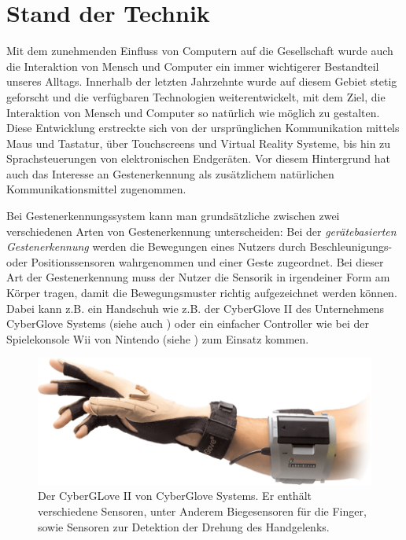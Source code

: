 \chapter{Stand der Technik}
\label{ch:StandDerTechnik}

Mit dem zunehmenden Einfluss von Computern auf die Gesellschaft wurde auch die Interaktion von Mensch und Computer ein immer wichtigerer Bestandteil unseres Alltags. Innerhalb der letzten Jahrzehnte wurde auf diesem Gebiet stetig geforscht und die verfügbaren Technologien weiterentwickelt, mit dem Ziel, die Interaktion von Mensch und Computer so natürlich wie möglich zu gestalten. Diese Entwicklung erstreckte sich von der ursprünglichen Kommunikation mittels Maus und Tastatur, über Touchscreens und Virtual Reality Systeme, bis hin zu Sprachsteuerungen von elektronischen Endgeräten. Vor diesem Hintergrund hat auch das Interesse an Gestenerkennung als zusätzlichem natürlichen Kommunikationsmittel zugenommen. 

Bei Gestenerkennungssystem kann man grundsätzliche zwischen zwei verschiedenen Arten von Gestenerkennung unterscheiden: Bei der \textit{gerätebasierten Gestenerkennung} werden die Bewegungen eines Nutzers durch Beschleunigungs- oder Positionssensoren wahrgenommen und einer Geste zugeordnet. Bei dieser Art der Gestenerkennung muss der Nutzer die Sensorik in irgendeiner Form am Körper tragen, damit die Bewegungsmuster richtig aufgezeichnet werden können. Dabei kann z.B. ein Handschuh wie z.B. der CyberGlove II des Unternehmens CyberGlove Systems (siehe auch ) oder ein einfacher Controller wie bei der Spielekonsole Wii von Nintendo (siehe ) zum Einsatz kommen.

\begin{figure}[h]
	\centering
	\includegraphics[scale=0.4]{../figures/CyberGlove.png}
	\caption{Der CyberGLove II von CyberGlove Systems. Er enthält verschiedene Sensoren, unter Anderem Biegesensoren für die Finger, sowie Sensoren zur Detektion der Drehung des Handgelenks. }
	\label{fig:CyberGlove}
\end{figure}

